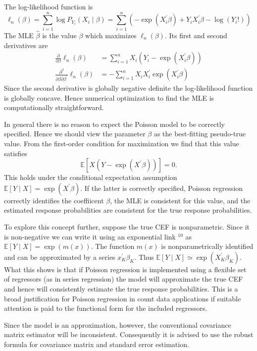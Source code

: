 \documentclass[10pt]{article}
\begin{document}
The log-likelihood function is
$$
\ell_{n}(\beta)=\sum_{i=1}^{n} \log P_{Y_{i}}\left(X_{i} \mid \beta\right)=\sum_{i=1}^{n}\left(-\exp \left(X_{i}^{\prime} \beta\right)+Y_{i} X_{i}^{\prime} \beta-\log \left(Y_{i} !\right)\right)
$$
The MLE $\widehat{\beta}$ is the value $\beta$ which maximizes $\ell_{n}(\beta)$. Its first and second derivatives are
$$
\begin{aligned}
\frac{\partial}{\partial \beta} \ell_{n}(\beta) &=\sum_{i=1}^{n} X_{i}\left(Y_{i}-\exp \left(X_{i}^{\prime} \beta\right)\right) \\
\frac{\partial^{2}}{\partial \beta \partial \beta^{\prime}} \ell_{n}(\beta) &=-\sum_{i=1}^{n} X_{i} X_{i}^{\prime} \exp \left(X_{i}^{\prime} \beta\right)
\end{aligned}
$$
Since the second derivative is globally negative definite the log-likelihood function is globally concave. Hence numerical optimization to find the MLE is computationally straightforward.

In general there is no reason to expect the Poisson model to be correctly specified. Hence we should view the parameter $\beta$ as the best-fitting pseudo-true value. From the first-order condition for maximization we find that this value satisfies
$$
\mathbb{E}\left[X\left(Y-\exp \left(X^{\prime} \beta\right)\right)\right]=0 .
$$
This holds under the conditional expectation assumption $\mathbb{E}[Y \mid X]=\exp \left(X^{\prime} \beta\right)$. If the latter is correctly specified, Poisson regression correctly identifies the coeffiicent $\beta$, the MLE is consistent for this value, and the estimated response probabilities are consistent for the true response probabilities.

To explore this concept further, suppose the true CEF is nonparametric. Since it is non-negative we can write it using an exponential link ${ }^{10}$ as $\mathbb{E}[Y \mid X]=\exp (m(x))$. The function $m(x)$ is nonparametrically identified and can be approximated by a series $x_{K}^{\prime} \beta_{K}$. Thus $\mathbb{E}[Y \mid X] \simeq \exp \left(X_{K}^{\prime} \beta_{K}\right)$. What this shows is that if Poisson regression is implemented using a flexible set of regressors (as in series regression) the model will approximate the true CEF and hence will consistently estimate the true response probabilities. This is a broad justification for Poisson regression in count data applications if suitable attention is paid to the functional form for the included regressors.

Since the model is an approximation, however, the conventional covariance matrix estimator will be inconsistent. Consequently it is advised to use the robust formula for covariance matrix and standard error estimation.
\end{document}
